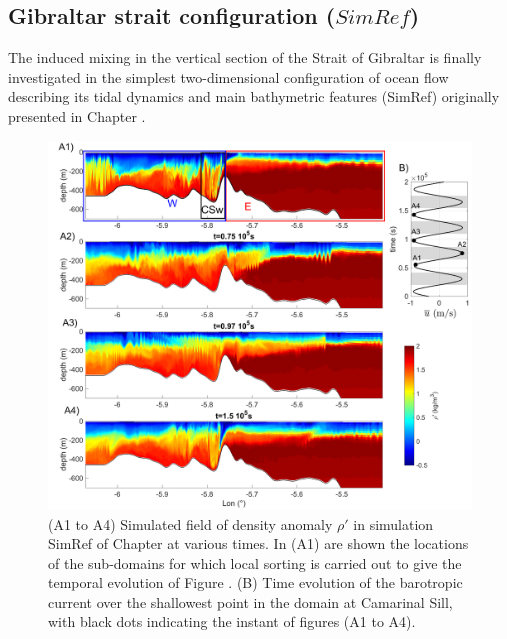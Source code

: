 \subsection{Gibraltar strait configuration ($SimRef$)}
\label{section_BPE_GBR}
The induced mixing in the vertical section of the Strait of Gibraltar is finally investigated in the simplest two-dimensional configuration of ocean flow describing its tidal dynamics and main bathymetric features (SimRef) originally presented in Chapter .
\begin{figure}[h!]
\centering
\includegraphics[width=1\textwidth]{./CHAP_BPE/Fig_Kappa_CS_ex.png}
\caption[Field of density anomaly in SimRef and definition of sub-domains.]{(A1 to A4) Simulated field of density anomaly $\rho'$ in simulation SimRef of Chapter  at various times. In (A1) are shown the locations of the sub-domains for which local sorting is carried out to give the temporal evolution of Figure . (B) Time evolution of the barotropic current over the shallowest point in the domain at Camarinal Sill, with black dots indicating the instant of figures (A1 to A4).}
\label{figCgbr2d_ex}
\end{figure}
